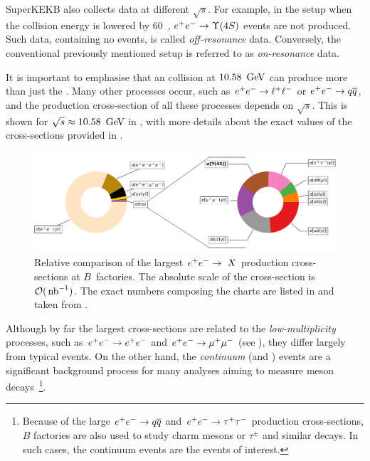 SuperKEKB also collects data at different $\sqrt{s}$.
For example, in the setup when the collision energy is lowered by 60~\mev, $\epem\ra\FourS$ events are not produced.
Such data, containing no \FourS events, is called \textit{off-resonance} data.
Conversely, the conventional previously mentioned setup is referred to as \textit{on-resonance} data.

It is important to emphasise that an \epem collision at $10.58~\mathrm{\,Ge\kern -0.1em V}$ can produce more than just the \FourS.
Many other processes occur, such as $e^+e^-\rightarrow\ell^+\ell^-$ or $e^+e^-\rightarrow q\overline q$, and the production 
cross-section of all these processes depends on $\sqrt{s}$.
This is shown for \mbox{$\sqrt{s}\approx10.58~\mathrm{\,Ge\kern -0.1em V}$} in , with more details about the exact values of the cross-sections provided in .
\begin{figure}[hbtp!]
    \includegraphics[width=1\textwidth]{figures/experimental_setup/corss_sections.pdf}
    \caption{\label{fig:cross_sections} Relative comparison of the largest $e^+e^-\rightarrow\ X$ production cross-sections at $B$~factories.
    The absolute scale of the cross-section is $\mathcal{O}({\rm \,nb}^{-1})$.
    The exact numbers composing the charts are listed in  and taken from \cite{Belle-II:2018jsg}.
    }
\end{figure}

Although by far the largest cross-sections are related to the \textit{low-multiplicity} processes, 
such as \mbox{$e^+e^-\rightarrow e^+e^-$} and \mbox{$e^+e^-\rightarrow\mu^+\mu^-$} (see ),
they differ largely from typical \mbox{\FourS\ra\BB} events.
On the other hand, the \textit{continuum} (\epem\ra\qqbar and \epem\ra\tautau) 
events are a significant background process for many analyses aiming to measure \B meson decays~\footnote{Because of the large $e^+e^-\rightarrow q\overline q$ and $e^+e^-\rightarrow\tau^+\tau^-$ production cross-sections, 
$B$ factories are also used to study charm mesons or $\tau^{\pm}$ and similar decays. 
In such cases, the continuum events are the events of interest.}.

